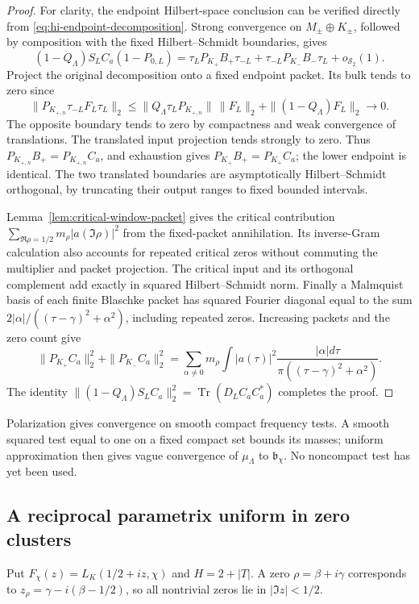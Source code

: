 \begin{proof}
For clarity, the endpoint Hilbert-space conclusion can be verified
directly from \eqref{eq:hi-endpoint-decomposition}. Strong convergence
on $M_\pm\oplus K_\pm$, followed by composition with the fixed
Hilbert--Schmidt boundaries, gives
\[
 (1-Q_\Lambda)S_LC_a(1-P_{0,L})
 =\tau_LP_{K_+}B_+\tau_{-L}
  +\tau_{-L}P_{K_-}B_-\tau_L+o_{\mathcal S_2}(1).
\]
Project the original decomposition onto a fixed endpoint packet.
Its bulk tends to zero since
\[
 \|P_{K_{+,n}}\tau_{-L}F_L\tau_L\|_2
 \le \|Q_\Lambda\tau_LP_{K_{+,n}}\|\,\|F_L\|_2
           +\|(1-Q_\Lambda)F_L\|_2\longrightarrow0.
\]
The opposite boundary tends to zero by compactness and weak convergence
of translations. The translated input projection tends strongly to zero.
Thus $P_{K_{+,n}}B_+=P_{K_{+,n}}C_a$, and exhaustion gives
$P_{K_+}B_+=P_{K_+}C_a$; the lower endpoint is identical.
The two translated boundaries are asymptotically Hilbert--Schmidt
orthogonal, by truncating their output ranges to fixed bounded intervals.

Lemma~\ref{lem:critical-window-packet} gives the critical contribution
$\sum_{\Re\rho=1/2}m_\rho|a(\Im\rho)|^2$ from the fixed-packet
annihilation. Its inverse-Gram calculation also accounts for repeated
critical zeros without commuting the multiplier and packet projection.
The critical input and its orthogonal complement add exactly in squared
Hilbert--Schmidt norm. Finally a Malmquist basis of each finite Blaschke
packet has squared Fourier diagonal equal to the sum
$2|\alpha|/((\tau-\gamma)^2+\alpha^2)$, including repeated zeros.
Increasing packets and the zero count give
\[
 \|P_{K_+}C_a\|_2^2+\|P_{K_-}C_a\|_2^2
 =\sum_{\alpha\ne0}m_\rho
       \int |a(\tau)|^2
             \frac{|\alpha|d\tau}{\pi((\tau-\gamma)^2+\alpha^2)}.
\]
The identity
$\|(1-Q_\Lambda)S_LC_a\|_2^2=\operatorname{Tr}(D_LC_aC_a^*)$
completes the proof.
\end{proof}

Polarization gives convergence on smooth compact frequency tests. A
smooth squared test equal to one on a fixed compact set bounds its masses;
uniform approximation then gives vague convergence of $\mu_\Lambda$ to
$\mathfrak b_\chi$. No noncompact test has yet been used.

\subsection{A reciprocal parametrix uniform in zero clusters}

Put $F_\chi(z)=L_K(1/2+iz,\chi)$ and $H=2+|T|$. A zero
$\rho=\beta+i\gamma$ corresponds to
$z_\rho=\gamma-i(\beta-1/2)$, so all nontrivial zeros lie in
$|\Im z|<1/2$.

